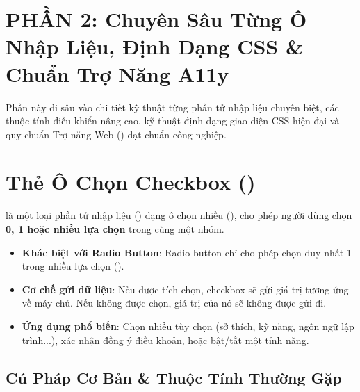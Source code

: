 \section[PHẦN 2: Chuyên Sâu Từng Ô Nhập Liệu, Định Dạng CSS \& Trợ Năng A11y]{PHẦN 2: Chuyên Sâu Từng Ô Nhập Liệu, Định Dạng CSS \& Chuẩn Trợ Năng A11y}
\label{sec:form_part2_deepdive}

Phần này đi sâu vào chi tiết kỹ thuật từng phần tử nhập liệu chuyên biệt, các thuộc tính điều khiển nâng cao, kỹ thuật định dạng giao diện CSS hiện đại và quy chuẩn Trợ năng Web () đạt chuẩn công nghiệp.


\section[Thẻ Ô Chọn Checkbox (\taghint{<input type="checkbox">})]{Thẻ Ô Chọn Checkbox ()}
\label{sec:html_checkbox}

\begin{conceptBox}
 là một loại phần tử nhập liệu () dạng ô chọn nhiều (), cho phép người dùng chọn \textbf{0, 1 hoặc nhiều lựa chọn} trong cùng một nhóm.
\begin{itemize}[leftmargin=1.5em, itemsep=2pt, parsep=0pt]
    \item \textbf{Khác biệt với Radio Button}: Radio button chỉ cho phép chọn duy nhất 1 trong nhiều lựa chọn ().
    \item \textbf{Cơ chế gửi dữ liệu}: Nếu được tích chọn, checkbox sẽ gửi giá trị tương ứng về máy chủ. Nếu không được chọn, giá trị của nó sẽ không được gửi đi.
    \item \textbf{Ứng dụng phổ biến}: Chọn nhiều tùy chọn (sở thích, kỹ năng, ngôn ngữ lập trình...), xác nhận đồng ý điều khoản, hoặc bật/tắt một tính năng.
\end{itemize}
\end{conceptBox}

\subsection{Cú Pháp Cơ Bản \& Thuộc Tính Thường Gặp}

